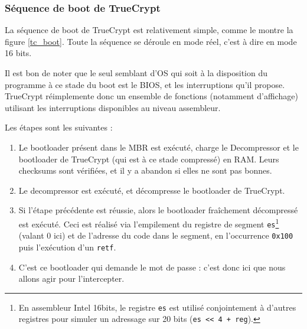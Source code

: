 \documentclass[12pt,a4paper]{article}
\begin{document}
\subsubsection{Séquence de boot de TrueCrypt}

La séquence de boot de TrueCrypt est relativement simple, comme le montre la
figure \ref{tc_boot}. Toute la séquence se déroule en mode réel, c'est à dire
en mode 16 bits.

Il est bon de noter que le seul semblant d'OS qui soit à la disposition du
programme à ce stade du boot est le BIOS, et les interruptions qu'il propose.
TrueCrypt réimplemente donc un ensemble de fonctions (notamment d'affichage)
utilisant les interruptions disponibles au niveau assembleur.

Les étapes sont les suivantes :
\begin{enumerate}
    \item Le bootloader présent dans le MBR est exécuté, charge le Decompressor
    et le bootloader de TrueCrypt (qui est à ce stade compressé) en RAM. Leurs
    checksums sont vérifiées, et il y a abandon si elles ne sont pas bonnes.
    \item Le decompressor est exécuté, et décompresse le bootloader de
    TrueCrypt.
    \item Si l'étape précédente est réussie, alors le bootloader fraîchement
    décompressé est exécuté. Ceci est réalisé via l'empilement du registre de
    segment \texttt{es}\footnote{En assembleur Intel 16bits, le registre
    \texttt{es} est utilisé conjointement à d'autres registres pour simuler un
    adressage sur 20 bits (\texttt{es << 4 + reg}).} (valant 0 ici) et de
    l'adresse du code dans le segment, en l'occurrence \texttt{0x100} puis
    l'exécution d'un \texttt{retf}.
    \item C'est ce bootloader qui demande le mot de passe : 
    c'est donc ici que nous allons agir pour l'intercepter.
\end{enumerate}
\end{document}
